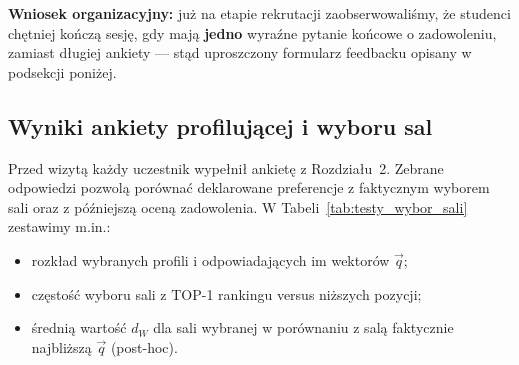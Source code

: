 \documentclass[14pt,a4paper]{extarticle}
\begin{document}
\begin{table}[H]
    \centering
    \caption{Charakterystyka uczestników testów terenowych aplikacji MiniInfo ($N=45$).}
    \label{tab:charakterystyka}
\end{table}

\textbf{Wniosek organizacyjny:} już na etapie rekrutacji zaobserwowaliśmy, że studenci chętniej kończą sesję, gdy mają \textbf{jedno} wyraźne pytanie końcowe o zadowoleniu, zamiast długiej ankiety --- stąd uproszczony formularz feedbacku opisany w podsekcji poniżej.

\subsection{Wyniki ankiety profilującej i wyboru sal}
Przed wizytą każdy uczestnik wypełnił ankietę z Rozdziału~2. Zebrane odpowiedzi pozwolą porównać deklarowane preferencje z faktycznym wyborem sali oraz z późniejszą oceną zadowolenia. W Tabeli~\ref{tab:testy_wybor_sali} zestawimy m.in.:
\begin{itemize}
    \item rozkład wybranych profili i odpowiadających im wektorów $\vec{q}$;
    \item częstość wyboru sali z TOP-1 rankingu versus niższych pozycji;
    \item średnią wartość $d_W$ dla sali wybranej w porównaniu z salą faktycznie najbliższą $\vec{q}$ (post-hoc).
\end{itemize}
\end{document}
